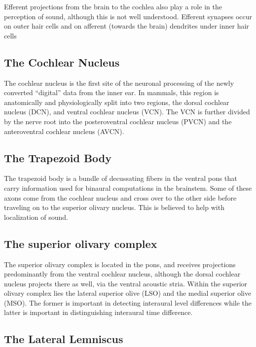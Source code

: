\documentclass[]{book}
\begin{document}
Efferent projections from the brain to the cochlea also play a role in the perception of sound, although this is not well understood. Efferent synapses occur on outer hair cells and on afferent (towards the brain) dendrites under inner hair cells

\hypertarget{the-cochlear-nucleus}{%
\subsection{The Cochlear Nucleus}\label{the-cochlear-nucleus}}

The cochlear nucleus is the first site of the neuronal processing of the newly converted ``digital'' data from the inner ear. In mammals, this region is anatomically and physiologically split into two regions, the dorsal cochlear nucleus (DCN), and ventral cochlear nucleus (VCN). The VCN is further divided by the nerve root into the posteroventral cochlear nucleus (PVCN) and the anteroventral cochlear nucleus (AVCN).

\hypertarget{the-trapezoid-body}{%
\subsection{The Trapezoid Body}\label{the-trapezoid-body}}

The trapezoid body is a bundle of decussating fibers in the ventral pons that carry information used for binaural computations in the brainstem. Some of these axons come from the cochlear nucleus and cross over to the other side before traveling on to the superior olivary nucleus. This is believed to help with localization of sound.

\hypertarget{the-superior-olivary-complex}{%
\subsection{The superior olivary complex}\label{the-superior-olivary-complex}}

The superior olivary complex is located in the pons, and receives projections predominantly from the ventral cochlear nucleus, although the dorsal cochlear nucleus projects there as well, via the ventral acoustic stria. Within the superior olivary complex lies the lateral superior olive (LSO) and the medial superior olive (MSO). The former is important in detecting interaural level differences while the latter is important in distinguishing interaural time difference.

\hypertarget{the-lateral-lemniscus}{%
\subsection{The Lateral Lemniscus}\label{the-lateral-lemniscus}}
\end{document}
